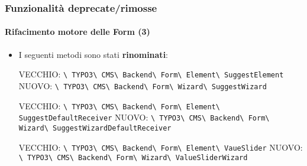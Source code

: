 \begin{frame}[fragile]
	\frametitle{Funzionalità deprecate/rimosse}
	\framesubtitle{Rifacimento motore delle Form (3)}

	\begin{itemize}

		\item I seguenti metodi sono stati \textbf{rinominati}:

			\smaller
				VECCHIO:\tabto{1.2cm}
					\texttt{\textbackslash
						TYPO3\textbackslash
						CMS\textbackslash
						Backend\textbackslash
						Form\textbackslash
						Element\textbackslash
						SuggestElement}\newline
				NUOVO:\tabto{1.2cm}
					\texttt{\textbackslash
						TYPO3\textbackslash
						CMS\textbackslash
						Backend\textbackslash
						Form\textbackslash
						Wizard\textbackslash
						SuggestWizard}\newline

				VECCHIO:\tabto{1.2cm}
					\texttt{\textbackslash
						TYPO3\textbackslash
						CMS\textbackslash
						Backend\textbackslash
						Form\textbackslash
						Element\textbackslash
						SuggestDefaultReceiver}\newline
				NUOVO:\tabto{1.2cm}
					\texttt{\textbackslash
						TYPO3\textbackslash
						CMS\textbackslash
						Backend\textbackslash
						Form\textbackslash
						Wizard\textbackslash
						SuggestWizardDefaultReceiver}\newline

				VECCHIO:\tabto{1.2cm}
					\texttt{\textbackslash
						TYPO3\textbackslash
						CMS\textbackslash
						Backend\textbackslash
						Form\textbackslash
						Element\textbackslash
						VaueSlider}\newline
				NUOVO:\tabto{1.2cm}
					\texttt{\textbackslash
						TYPO3\textbackslash
						CMS\textbackslash
						Backend\textbackslash
						Form\textbackslash
						Wizard\textbackslash
						ValueSliderWizard}\newline

			\normalsize

	\end{itemize}

\end{frame}


